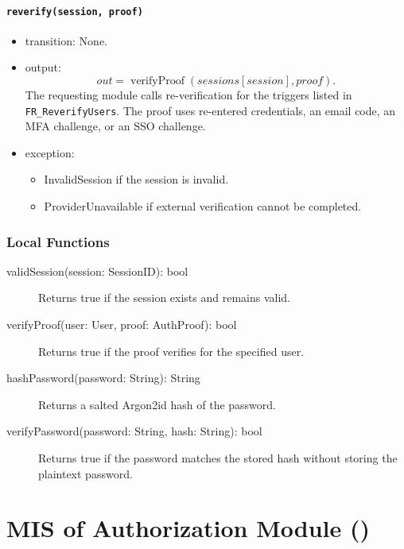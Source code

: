 \documentclass[12pt, titlepage]{article}
\newcommand{\moduleid}[1]{\texttt{\detokenize{#1}}}
\begin{document}
\paragraph{\texttt{reverify(session, proof)}}
\begin{itemize}
    \item transition: None.
    \item output:
    \[
    out=
    \operatorname{verifyProof}
    (\mathit{sessions}[session],proof).
    \]
    The requesting module calls re-verification for the triggers listed in \texttt{FR\_ReverifyUsers}. The proof uses re-entered credentials, an email code, an MFA challenge, or an SSO challenge.

    \item exception:
    \begin{itemize}
    \item InvalidSession if the session is invalid.
    \item ProviderUnavailable if external verification cannot be completed.
    \end{itemize}
\end{itemize}

\subsubsection{Local Functions}

\begin{description}
    \item[validSession(session: SessionID): bool] Returns true if the session exists and remains valid.
    \item[verifyProof(user: User, proof: AuthProof): bool] Returns true if the proof verifies for the specified user.
    \item[hashPassword(password: String): String] Returns a salted Argon2id hash of the password.
    \item[verifyPassword(password: String, hash: String): bool] Returns true if the password matches the stored hash without storing the plaintext password.
\end{description}

\newpage

\section[MIS of Authorization Module]{MIS of Authorization Module (\moduleid{M_Authorization})}
\label{M_Authorization}
\end{document}
